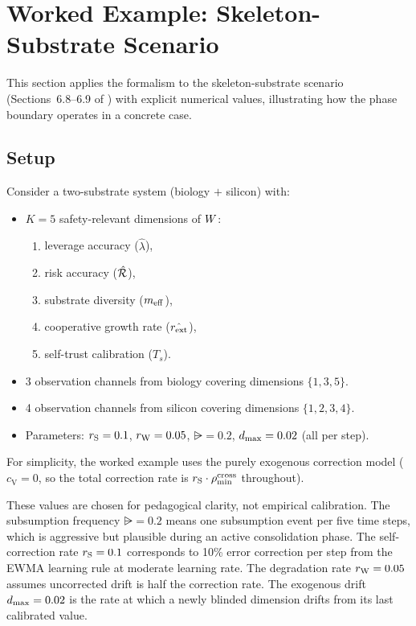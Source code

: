 \section{Worked Example: Skeleton-Substrate Scenario}
\label{sec:worked_example}

This section applies the formalism to the skeleton-substrate
scenario (Sections~6.8--6.9 of \citet{lasser2026horizon}) with explicit
numerical values, illustrating how the phase boundary operates in a
concrete case.

\subsection{Setup}

Consider a two-substrate system (biology $+$ silicon) with:
\begin{itemize}
\item $K = 5$ safety-relevant dimensions of $W$:
  \begin{enumerate}
  \item leverage accuracy ($\hat{\lambda}$),
  \item risk accuracy ($\hat{\mathcal{R}}$),
  \item substrate diversity ($m_{\mathrm{eff}}$),
  \item cooperative growth rate ($\hat{r_{\mathrm{ext}}}$),
  \item self-trust calibration ($T_s$).
  \end{enumerate}
\item 3 observation channels from biology covering dimensions
  $\{1, 3, 5\}$.
\item 4 observation channels from silicon covering dimensions
  $\{1, 2, 3, 4\}$.
\item Parameters: $r_{\mathrm{S}} = 0.1$, $r_{\mathrm{W}} = 0.05$, $\rsub = 0.2$,
  $d_{\mathrm{max}} = 0.02$ (all per step).
\end{itemize}

For simplicity, the worked example uses the purely exogenous correction
model ($c_{\mathrm{V}} = 0$, so the total correction rate is
$r_{\mathrm{S}} \cdot \rho_{\min}^{\mathrm{cross}}$ throughout).

These values are chosen for pedagogical clarity, not empirical
calibration.  The subsumption frequency $\rsub = 0.2$ means one
subsumption event per five time steps, which is aggressive but
plausible during an active consolidation phase.  The self-correction
rate $r_{\mathrm{S}} = 0.1$ corresponds to 10\% error correction per step from
the EWMA learning rule at moderate learning rate.  The degradation rate
$r_{\mathrm{W}} = 0.05$ assumes uncorrected drift is half the correction rate.
The exogenous drift $d_{\mathrm{max}} = 0.02$ is the rate at which a newly blinded
dimension drifts from its last calibrated value.

